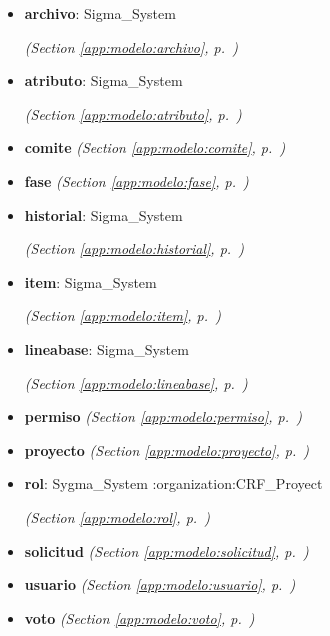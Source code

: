 \begin{itemize}
\setlength{\parskip}{0ex}
\item \textbf{archivo}: Sigma\_System



  \textit{(Section \ref{app:modelo:archivo}, p.~\pageref{app:modelo:archivo})}

\item \textbf{atributo}: Sigma\_System



  \textit{(Section \ref{app:modelo:atributo}, p.~\pageref{app:modelo:atributo})}

\item \textbf{comite}
  \textit{(Section \ref{app:modelo:comite}, p.~\pageref{app:modelo:comite})}

\item \textbf{fase}
  \textit{(Section \ref{app:modelo:fase}, p.~\pageref{app:modelo:fase})}

\item \textbf{historial}: Sigma\_System



  \textit{(Section \ref{app:modelo:historial}, p.~\pageref{app:modelo:historial})}

\item \textbf{item}: Sigma\_System



  \textit{(Section \ref{app:modelo:item}, p.~\pageref{app:modelo:item})}

\item \textbf{lineabase}: Sigma\_System



  \textit{(Section \ref{app:modelo:lineabase}, p.~\pageref{app:modelo:lineabase})}

\item \textbf{permiso}
  \textit{(Section \ref{app:modelo:permiso}, p.~\pageref{app:modelo:permiso})}

\item \textbf{proyecto}
  \textit{(Section \ref{app:modelo:proyecto}, p.~\pageref{app:modelo:proyecto})}

\item \textbf{rol}: Sygma\_System :organization:CRF\_Proyect



  \textit{(Section \ref{app:modelo:rol}, p.~\pageref{app:modelo:rol})}

\item \textbf{solicitud}
  \textit{(Section \ref{app:modelo:solicitud}, p.~\pageref{app:modelo:solicitud})}

\item \textbf{usuario}
  \textit{(Section \ref{app:modelo:usuario}, p.~\pageref{app:modelo:usuario})}

\item \textbf{voto}
  \textit{(Section \ref{app:modelo:voto}, p.~\pageref{app:modelo:voto})}

\end{itemize}


